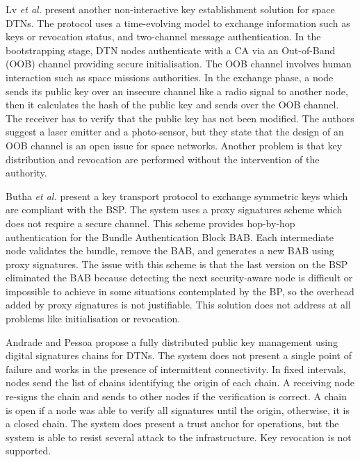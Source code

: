 
Lv \textit{et al.} \cite{lv2014non} present another non-interactive key establishment solution for space DTNs. The protocol uses a time-evolving model to exchange information such as keys or revocation status, and two-channel message authentication. In the bootstrapping stage, DTN nodes authenticate with a CA via an Out-of-Band (OOB) channel providing secure initialisation. The OOB channel involves human interaction such as space missions authorities. In the exchange phase, a node sends its public key over an insecure channel like a radio signal to another node, then it calculates the hash of the public key and sends over the OOB channel. The receiver has to verify that the public key has not been modified. The authors suggest a laser emitter and a photo-sensor, but they state that the design of an OOB channel is an open issue for space networks.  Another problem is that key distribution and revocation are performed without the intervention of the authority.  


Butha \textit{et al.} \cite{bhutta2014efficient} present a key transport protocol to exchange symmetric keys which are compliant with the BSP. The system uses a proxy signatures scheme which does not require a secure channel. This scheme provides hop-by-hop authentication for the Bundle Authentication Block BAB. Each intermediate node validates the bundle, remove the BAB, and generates a new BAB using proxy signatures. The issue with this scheme is that the last version on the BSP eliminated the BAB because detecting the next security-aware node is difficult or impossible to achieve in some situations contemplated by the BP, so the overhead added by proxy signatures is not justifiable. This solution does not address at all problems like initialisation or revocation.

Andrade and Pessoa \cite{de2016fully} propose a fully distributed public key management using digital signatures chains for DTNs. The system does not present a single point of failure and works in the presence of intermittent connectivity. In fixed intervals, nodes send the list of chains identifying the origin of each chain. A receiving node re-signs the chain and sends to other nodes if the verification is correct. A chain is open if a node was able to verify all signatures until the origin, otherwise, it is a closed chain. The system does present a trust anchor for operations, but the system is able to resist several attack to the infrastructure. Key revocation is not supported.


